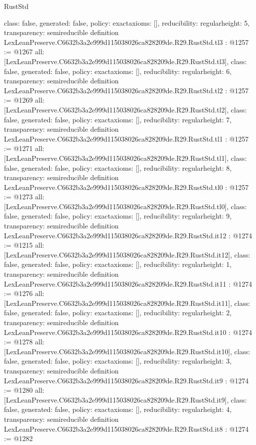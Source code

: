 \begin{lexlean}{RustStd}
\begin{coremodule}
{  class: false,
  generated: false,
  policy: exact{axioms: []},
  reducibility: regular{height: 5},
  transparency: semireducible
}
definition LexLeanPreserve.C6632b3a2e999d115038026ca828209de.R29.RustStd.tl3 : @1257 := @1267 {
  all: [LexLeanPreserve.C6632b3a2e999d115038026ca828209de.R29.RustStd.tl3],
  class: false,
  generated: false,
  policy: exact{axioms: []},
  reducibility: regular{height: 6},
  transparency: semireducible
}
definition LexLeanPreserve.C6632b3a2e999d115038026ca828209de.R29.RustStd.tl2 : @1257 := @1269 {
  all: [LexLeanPreserve.C6632b3a2e999d115038026ca828209de.R29.RustStd.tl2],
  class: false,
  generated: false,
  policy: exact{axioms: []},
  reducibility: regular{height: 7},
  transparency: semireducible
}
definition LexLeanPreserve.C6632b3a2e999d115038026ca828209de.R29.RustStd.tl1 : @1257 := @1271 {
  all: [LexLeanPreserve.C6632b3a2e999d115038026ca828209de.R29.RustStd.tl1],
  class: false,
  generated: false,
  policy: exact{axioms: []},
  reducibility: regular{height: 8},
  transparency: semireducible
}
definition LexLeanPreserve.C6632b3a2e999d115038026ca828209de.R29.RustStd.tl0 : @1257 := @1273 {
  all: [LexLeanPreserve.C6632b3a2e999d115038026ca828209de.R29.RustStd.tl0],
  class: false,
  generated: false,
  policy: exact{axioms: []},
  reducibility: regular{height: 9},
  transparency: semireducible
}
definition LexLeanPreserve.C6632b3a2e999d115038026ca828209de.R29.RustStd.it12 : @1274 := @1215 {
  all: [LexLeanPreserve.C6632b3a2e999d115038026ca828209de.R29.RustStd.it12],
  class: false,
  generated: false,
  policy: exact{axioms: []},
  reducibility: regular{height: 1},
  transparency: semireducible
}
definition LexLeanPreserve.C6632b3a2e999d115038026ca828209de.R29.RustStd.it11 : @1274 := @1276 {
  all: [LexLeanPreserve.C6632b3a2e999d115038026ca828209de.R29.RustStd.it11],
  class: false,
  generated: false,
  policy: exact{axioms: []},
  reducibility: regular{height: 2},
  transparency: semireducible
}
definition LexLeanPreserve.C6632b3a2e999d115038026ca828209de.R29.RustStd.it10 : @1274 := @1278 {
  all: [LexLeanPreserve.C6632b3a2e999d115038026ca828209de.R29.RustStd.it10],
  class: false,
  generated: false,
  policy: exact{axioms: []},
  reducibility: regular{height: 3},
  transparency: semireducible
}
definition LexLeanPreserve.C6632b3a2e999d115038026ca828209de.R29.RustStd.it9 : @1274 := @1280 {
  all: [LexLeanPreserve.C6632b3a2e999d115038026ca828209de.R29.RustStd.it9],
  class: false,
  generated: false,
  policy: exact{axioms: []},
  reducibility: regular{height: 4},
  transparency: semireducible
}
definition LexLeanPreserve.C6632b3a2e999d115038026ca828209de.R29.RustStd.it8 : @1274 := @1282 {
}
\end{coremodule}
\end{lexlean}
